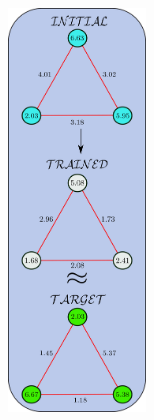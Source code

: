 \begin{figure}
\centering
\begin{subfigure}[t]{0.45\textwidth}
    \centering
    \includegraphics[width=0.4\textwidth, height = 0.9\textwidth]{images/FIG_S5a_circuit_init_three_qubits_vertical.pdf}
    \caption{}\label{subfig:auto_comp_3_params}
\end{subfigure}
\begin{subfigure}[t]{0.45\textwidth}
\centering
\end{subfigure}
\end{figure}
